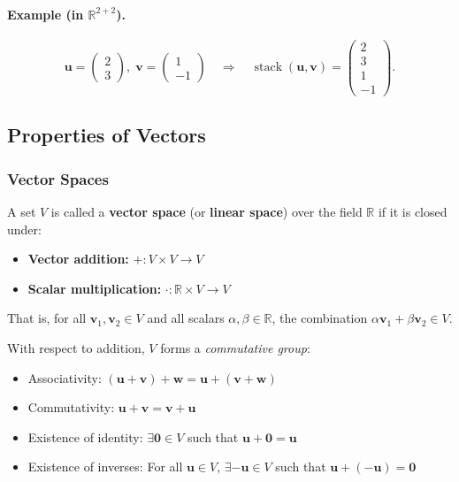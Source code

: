 \paragraph{Example (in $\mathbb{R}^{2+2}$).}
\[
\mathbf{u}=\begin{pmatrix}2\\3\end{pmatrix},\;
\mathbf{v}=\begin{pmatrix}1\\-1\end{pmatrix}
\quad\Longrightarrow\quad
\operatorname{stack}(\mathbf{u},\mathbf{v})=
\begin{pmatrix}2\\3\\1\\-1\end{pmatrix}.
\]






\subsection{Properties of Vectors}
\subsubsection{Vector Spaces}

A set $V$ is called a \textbf{vector space} (or \textbf{linear space}) over the field $\mathbb{R}$ if it is closed under:
\begin{itemize}
    \item \textbf{Vector addition:} $+ : V \times V \to V$
    \item \textbf{Scalar multiplication:} $\cdot : \mathbb{R} \times V \to V$
\end{itemize}
That is, for all $\mathbf{v}_1, \mathbf{v}_2 \in V$ and all scalars $\alpha, \beta \in \mathbb{R}$, the combination $\alpha \mathbf{v}_1 + \beta \mathbf{v}_2 \in V$.

\vspace{1em}
\noindent
With respect to addition, $V$ forms a \textit{commutative group}:
\begin{itemize}
    \item Associativity: $(\mathbf{u} + \mathbf{v}) + \mathbf{w} = \mathbf{u} + (\mathbf{v} + \mathbf{w})$
    \item Commutativity: $\mathbf{u} + \mathbf{v} = \mathbf{v} + \mathbf{u}$
    \item Existence of identity: $\exists \mathbf{0} \in V$ such that $\mathbf{u} + \mathbf{0} = \mathbf{u}$
    \item Existence of inverses: For all $\mathbf{u} \in V$, $\exists -\mathbf{u} \in V$ such that $\mathbf{u} + (-\mathbf{u}) = \mathbf{0}$
\end{itemize}

